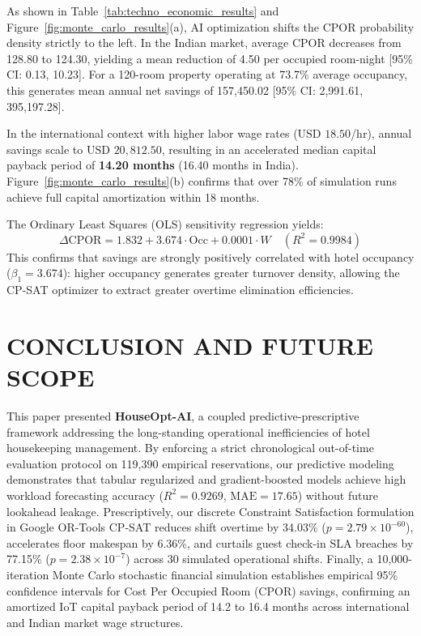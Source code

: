 \documentclass[11pt,a4paper]{article}
\newcommand{\INR}{\text{INR }}
\newcommand{\USD}{\text{USD }}
\begin{document}
As shown in Table~\ref{tab:techno_economic_results} and Figure~\ref{fig:monte_carlo_results}(a), AI optimization shifts the CPOR probability density strictly to the left. In the Indian market, average CPOR decreases from \INR 128.80 to \INR 124.30, yielding a mean reduction of \INR 4.50 per occupied room-night [95\% CI: 0.13, 10.23]. For a 120-room property operating at 73.7\% average occupancy, this generates mean annual net savings of \INR 157,450.02 [95\% CI: \INR 2,991.61, \INR 395,197.28]. 

In the international context with higher labor wage rates ($\USD 18.50$/hr), annual savings scale to $\USD 20,812.50$, resulting in an accelerated median capital payback period of \textbf{14.20 months} (16.40 months in India). Figure~\ref{fig:monte_carlo_results}(b) confirms that over 78\% of simulation runs achieve full capital amortization within 18 months.

The Ordinary Least Squares (OLS) sensitivity regression yields:
\begin{equation}
\Delta \text{CPOR} = 1.832 + 3.674 \cdot \text{Occ} + 0.0001 \cdot W \quad (R^2 = 0.9984)
\end{equation}
This confirms that savings are strongly positively correlated with hotel occupancy ($\beta_1 = 3.674$): higher occupancy generates greater turnover density, allowing the CP-SAT optimizer to extract greater overtime elimination efficiencies.

\section{CONCLUSION AND FUTURE SCOPE}

This paper presented \textbf{HouseOpt-AI}, a coupled predictive-prescriptive framework addressing the long-standing operational inefficiencies of hotel housekeeping management. By enforcing a strict chronological out-of-time evaluation protocol on 119,390 empirical reservations, our predictive modeling demonstrates that tabular regularized and gradient-boosted models achieve high workload forecasting accuracy ($R^2 = 0.9269$, $\text{MAE} = 17.65$) without future lookahead leakage. Prescriptively, our discrete Constraint Satisfaction formulation in Google OR-Tools CP-SAT reduces shift overtime by 34.03\% ($p = 2.79 \times 10^{-60}$), accelerates floor makespan by 6.36\%, and curtails guest check-in SLA breaches by 77.15\% ($p = 2.38 \times 10^{-7}$) across 30 simulated operational shifts. Finally, a 10,000-iteration Monte Carlo stochastic financial simulation establishes empirical 95\% confidence intervals for Cost Per Occupied Room (CPOR) savings, confirming an amortized IoT capital payback period of 14.2 to 16.4 months across international and Indian market wage structures.
\end{document}
